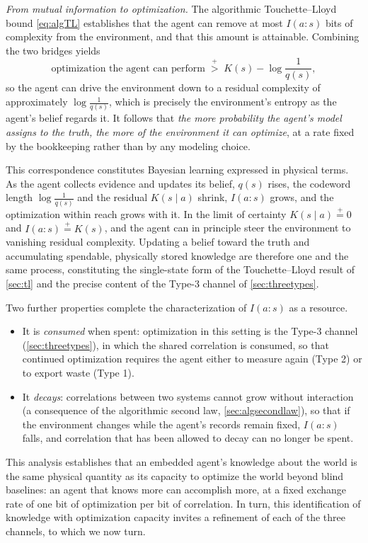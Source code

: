 \documentclass[11pt]{article}
\newcommand{\pgt}{\mathrel{\stackrel{+}{>}}}
\newcommand{\peq}{\mathrel{\stackrel{+}{=}}}
\begin{document}
\emph{From mutual information to optimization.} The algorithmic Touchette--Lloyd bound \eqref{eq:algTL} establishes that the agent can remove at most $I(a:s)$ bits of complexity from the environment, and that this amount is attainable. Combining the two bridges yields
\[
\text{optimization the agent can perform} \;\pgt\; K(s) - \log \frac{1}{q(s)},
\]
so the agent can drive the environment down to a residual complexity of approximately $\log\tfrac{1}{q(s)}$, which is precisely the environment's entropy as the agent's belief regards it. It follows that \emph{the more probability the agent's model assigns to the truth, the more of the environment it can optimize}, at a rate fixed by the bookkeeping rather than by any modeling choice.

This correspondence constitutes Bayesian learning expressed in physical terms. As the agent collects evidence and updates its belief, $q(s)$ rises, the codeword length $\log\tfrac{1}{q(s)}$ and the residual $K(s\mid a)$ shrink, $I(a:s)$ grows, and the optimization within reach grows with it. In the limit of certainty $K(s\mid a) \peq 0$ and $I(a:s) \peq K(s)$, and the agent can in principle steer the environment to vanishing residual complexity. Updating a belief toward the truth and accumulating spendable, physically stored knowledge are therefore one and the same process, constituting the single-state form of the Touchette--Lloyd result of \cref{sec:tl} and the precise content of the Type-3 channel of \cref{sec:threetypes}.

Two further properties complete the characterization of $I(a:s)$ as a resource.
\begin{itemize}[leftmargin=2em]
  \item It is \emph{consumed} when spent: optimization in this setting is the Type-3 channel (\cref{sec:threetypes}), in which the shared correlation is consumed, so that continued optimization requires the agent either to measure again (Type 2) or to export waste (Type 1).
  \item It \emph{decays}: correlations between two systems cannot grow without interaction (a consequence of the algorithmic second law, \cref{sec:algsecondlaw}), so that if the environment changes while the agent's records remain fixed, $I(a:s)$ falls, and correlation that has been allowed to decay can no longer be spent.
\end{itemize}

This analysis establishes that an embedded agent's knowledge about the world is the same physical quantity as its capacity to optimize the world beyond blind baselines: an agent that knows more can accomplish more, at a fixed exchange rate of one bit of optimization per bit of correlation. In turn, this identification of knowledge with optimization capacity invites a refinement of each of the three channels, to which we now turn.
\end{document}
